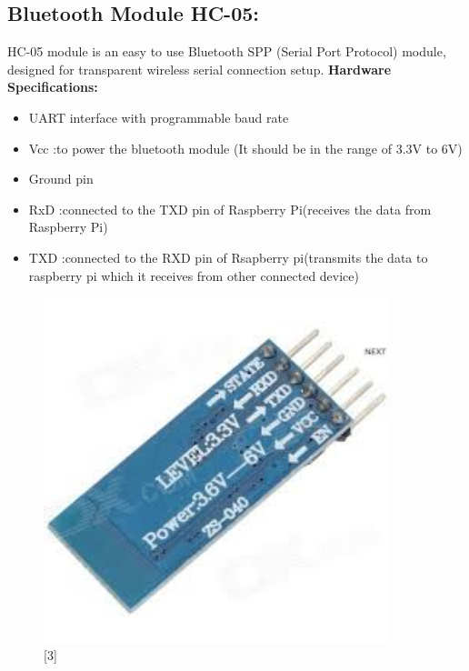 \documentclass[11pt,a4paper]{article}
\begin{document}
	\subsection{Bluetooth Module HC-05:}
	HC-05 module is an easy to use Bluetooth SPP (Serial Port Protocol) module, designed for transparent wireless serial connection setup.
	\newline
	    \textbf{Hardware Specifications:}
		\begin{itemize}
			\item UART interface with programmable baud rate
			\item Vcc :to power the bluetooth module (It should be in the range of 3.3V to 6V)
			\item Ground pin
			\item RxD :connected to the TXD pin of Raspberry Pi(receives the data from Raspberry Pi)
			\item TXD :connected to the RXD pin of Rsapberry pi(transmits the data to raspberry pi which it receives from other connected device)
		\end{itemize}
		\begin{figure}[h!]
			\includegraphics[width=10cm]{HC-05.jpg}
			\centering
			\caption{[3]}
		\end{figure}
\end{document}
